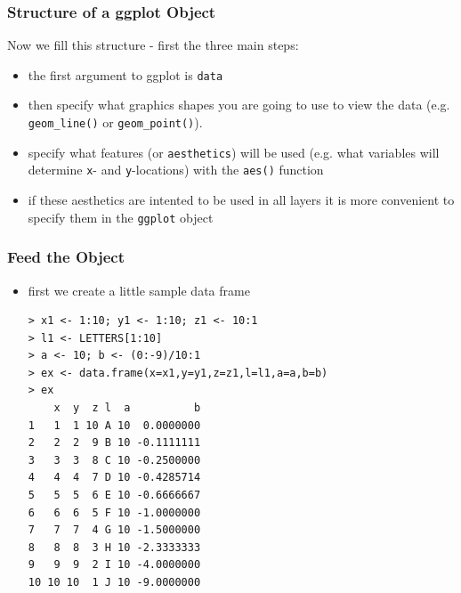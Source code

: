 \documentclass[xcolor={table},c]{beamer}
\begin{document}
\begin{frame}[fragile]\frametitle{Structure of a ggplot Object}
Now we fill this structure - first the three main steps:
  \begin{itemize}
    \item the first argument to ggplot is \texttt{data}
    \item then specify what graphics shapes you are going to use to view the data (e.g. \texttt{geom\_line()} or \texttt{geom\_point()}).
    \item specify what features (or \texttt{aesthetics}) will be used (e.g. what variables will determine \texttt{x}- and \texttt{y}-locations) with the \texttt{aes()} function
    \item if these aesthetics are intented to be used in all layers it is more convenient to specify them in the \texttt{ggplot} object
  \end{itemize}
\end{frame}

\begin{frame}[fragile]\frametitle{Feed the Object}
  \begin{itemize}
  \item first we create a little sample data frame\small
\begin{verbatim}
> x1 <- 1:10; y1 <- 1:10; z1 <- 10:1
> l1 <- LETTERS[1:10]
> a <- 10; b <- (0:-9)/10:1
> ex <- data.frame(x=x1,y=y1,z=z1,l=l1,a=a,b=b)
> ex
    x  y  z l  a          b
1   1  1 10 A 10  0.0000000
2   2  2  9 B 10 -0.1111111
3   3  3  8 C 10 -0.2500000
4   4  4  7 D 10 -0.4285714
5   5  5  6 E 10 -0.6666667
6   6  6  5 F 10 -1.0000000
7   7  7  4 G 10 -1.5000000
8   8  8  3 H 10 -2.3333333
9   9  9  2 I 10 -4.0000000
10 10 10  1 J 10 -9.0000000
\end{verbatim}
  \end{itemize}
\end{frame}
\end{document}
